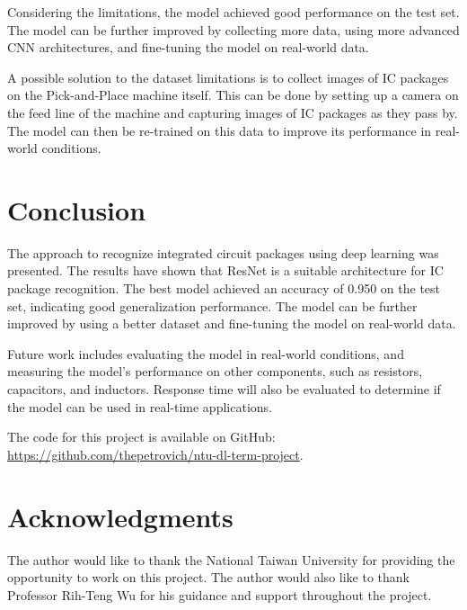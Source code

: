 \documentclass[preprint,12pt,3p,times]{elsarticle}
\begin{document}
Considering the limitations, the model achieved good performance on the test set. The model can be further improved by collecting more data, using more advanced CNN architectures, and fine-tuning the model on real-world data.

A possible solution to the dataset limitations is to collect images of IC packages on the Pick-and-Place machine itself. This can be done by setting up a camera on the feed line of the machine and capturing images of IC packages as they pass by. The model can then be re-trained on this data to improve its performance in real-world conditions.

\section{Conclusion}
The approach to recognize integrated circuit packages using deep learning was presented. The results have shown that ResNet is a suitable architecture for IC package recognition. The best model achieved an accuracy of 0.950 on the test set, indicating good generalization performance. The model can be further improved by using a better dataset and fine-tuning the model on real-world data.

Future work includes evaluating the model in real-world conditions, and measuring the model's performance on other components, such as resistors, capacitors, and inductors. Response time will also be evaluated to determine if the model can be used in real-time applications.

The code for this project is available on GitHub: \url{https://github.com/thepetrovich/ntu-dl-term-project}.

\section*{Acknowledgments}
The author would like to thank the National Taiwan University for providing the opportunity to work on this project. The author would also like to thank Professor Rih-Teng Wu for his guidance and support throughout the project.




\end{document}
